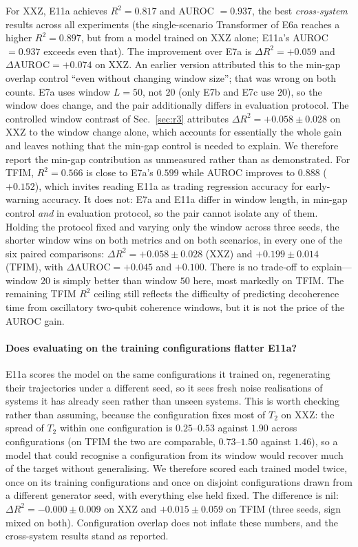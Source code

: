 \documentclass[twocolumn,10pt]{article}
\begin{document}
For XXZ, E11a achieves $R^2 = 0.817$ and AUROC $= 0.937$, the best
\emph{cross-system} results across all experiments (the single-scenario
Transformer of E6a reaches a higher $R^2 = 0.897$, but from a model
trained on XXZ alone; E11a's AUROC $=0.937$ exceeds even that).
The improvement over E7a is $\Delta R^2 = +0.059$ and
$\Delta\mathrm{AUROC} = +0.074$ on XXZ.
An earlier version attributed this to the min-gap overlap control
``even without changing window size''; that was wrong on both counts.
E7a uses window $L=50$, not $20$ (only E7b and E7c use $20$), so the
window does change, and the pair additionally differs in evaluation
protocol.
The controlled window contrast of Sec.~\ref{sec:r3} attributes
$\Delta R^2 = +0.058 \pm 0.028$ on XXZ to the window change alone,
which accounts for essentially the whole gain and leaves nothing that
the min-gap control is needed to explain.
We therefore report the min-gap contribution as unmeasured rather than
as demonstrated.
For TFIM, $R^2 = 0.566$ is close to E7a's $0.599$ while AUROC improves
to $0.888$ ($+0.152$), which invites reading E11a as trading regression
accuracy for early-warning accuracy.
It does not: E7a and E11a differ in window length, in min-gap control
\emph{and} in evaluation protocol, so the pair cannot isolate any of
them.
Holding the protocol fixed and varying only the window across three
seeds, the shorter window wins on both metrics and on both scenarios,
in every one of the six paired comparisons:
$\Delta R^2 = +0.058 \pm 0.028$ (XXZ) and $+0.199 \pm 0.014$ (TFIM),
with $\Delta\mathrm{AUROC} = +0.045$ and $+0.100$.
There is no trade-off to explain---window $20$ is simply better than
window $50$ here, most markedly on TFIM.
The remaining TFIM $R^2$ ceiling still reflects the difficulty of
predicting decoherence time from oscillatory two-qubit coherence
windows, but it is not the price of the AUROC gain.

\paragraph{Does evaluating on the training configurations flatter E11a?}
E11a scores the model on the same configurations it trained on,
regenerating their trajectories under a different seed, so it sees fresh
noise realisations of systems it has already seen rather than unseen
systems.
This is worth checking rather than assuming, because the configuration
fixes most of $T_2$ on XXZ: the spread of $T_2$ within one configuration
is $0.25$--$0.53$ against $1.90$ across configurations (on TFIM the two
are comparable, $0.73$--$1.50$ against $1.46$), so a model that could
recognise a configuration from its window would recover much of the
target without generalising.
We therefore scored each trained model twice, once on its training
configurations and once on disjoint configurations drawn from a
different generator seed, with everything else held fixed.
The difference is nil: $\Delta R^2 = -0.000 \pm 0.009$ on XXZ and
$+0.015 \pm 0.059$ on TFIM (three seeds, sign mixed on both).
Configuration overlap does not inflate these numbers, and the
cross-system results stand as reported.
\end{document}
